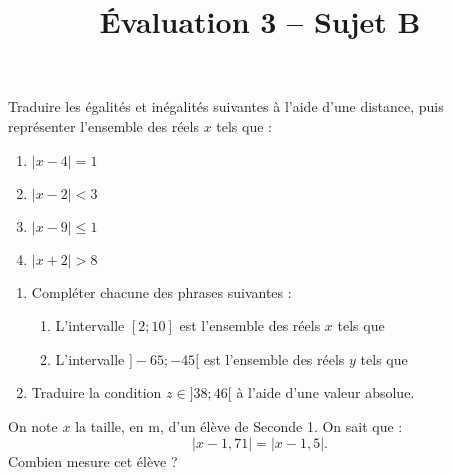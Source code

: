 \documentclass[a4paper,dvipsnames]{article}
\begin{document}
\title{Évaluation 3 -- Sujet B}
\author{}
\date{}

\maketitle{}

\pagestyle{empty}

\exo Traduire les égalités et inégalités suivantes à l'aide d'une distance, puis représenter l'ensemble des réels $x$ tels que :

\begin{multicols}{2}
  \begin{enumerate}
    \item $|x-4|=1$
    \item $|x-2|<3$
    \item $|x-9|\leq1$
    \item $|x+2|>8$
  \end{enumerate}
\end{multicols}

\bigskip

\exo 
\begin{enumerate}
\item Compléter chacune des phrases suivantes :
  \begin{enumerate}
    \item L'intervalle $[2;10]$ est l'ensemble des réels $x$ tels que 
    \item L'intervalle $]-65;-45[$ est l'ensemble des réels $y$ tels que 
  \end{enumerate}
\item Traduire la condition $z\in]38;46[$ à l'aide d'une valeur absolue.
\end{enumerate}

\bigskip

\exo On note $x$ la taille, en m, d'un élève de Seconde 1. On sait que :
\[|x-1,71| = |x-1,5|.\]
Combien mesure cet élève ?
\end{document}
